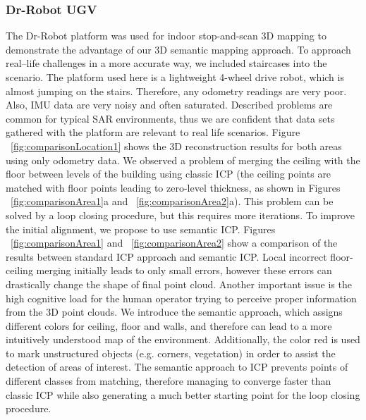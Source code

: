 \documentclass{article}
\begin{document}
\subsubsection{Dr-Robot UGV}
The Dr-Robot platform was used for indoor stop-and-scan 3D mapping to demonstrate the advantage of our 3D semantic mapping approach.
To approach real--life challenges in a more accurate way, we included staircases into the scenario.
The platform used here is a lightweight 4-wheel drive robot, which is almost jumping on the stairs.
Therefore, any odometry readings are very poor.
Also, IMU data are very noisy and often saturated.
Described problems are common for typical SAR environments, thus we are confident that data sets gathered with the platform are relevant to real life scenarios.
Figure ~\ref{fig:comparisonLocation1} shows the 3D reconstruction results for both areas using only odometry data.
We observed a problem of merging the ceiling with the floor between levels of the building using classic ICP (the ceiling points are matched with floor points leading to zero-level thickness, as shown in Figures ~\ref{fig:comparisonArea1}a and ~\ref{fig:comparisonArea2}a).
This problem can be solved by a loop closing procedure, but this requires more iterations.
To improve the initial alignment, we propose to use semantic ICP.
Figures ~\ref{fig:comparisonArea1} and ~\ref{fig:comparisonArea2} show a comparison of the results between standard ICP approach and semantic ICP.
Local incorrect floor-ceiling merging initially leads to only small errors, however these errors can drastically change the shape of final point cloud.
Another important issue is the high cognitive load for the human operator trying to perceive proper information from the 3D point clouds.
We introduce the semantic approach, which assigns different colors for ceiling, floor and walls, and therefore can lead to a more intuitively understood map of the environment.
Additionally, the color red is used to mark unstructured objects (e.g. corners, vegetation) in order to assist the detection of areas of interest. The semantic approach to ICP prevents points of different classes from matching, therefore managing to converge faster than classic ICP while also generating a much better starting point for the loop closing procedure.
\end{document}
